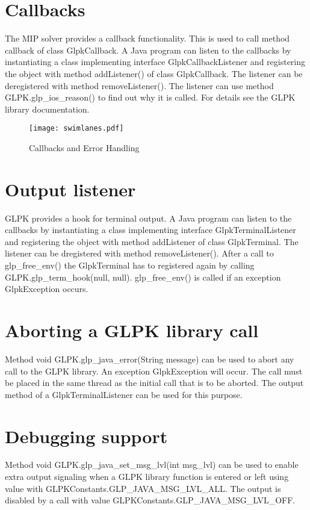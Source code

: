 \documentclass[a4paper,11pt]{report}
\begin{document}
\section{Callbacks}
The MIP solver provides a callback functionality. This is used to call
method callback of class GlpkCallback. A Java program can listen to the
callbacks by instantiating a class implementing interface
GlpkCallbackListener and registering the object with method addListener()
of class GlpkCallback. The listener can be deregistered with method
removeListener(). The listener can use method GLPK.glp\_ios\_reason() to find
out why it is called. For details see the GLPK library documentation.

\begin{landscape}
\begin{figure}
\caption{Callbacks and Error Handling}
\texttt{[image: swimlanes.pdf]}
\end{figure}
\end{landscape}

\section{Output listener}
GLPK provides a hook for terminal output. A Java program can listen to the
callbacks by instantiating a class implementing interface GlpkTerminalListener
and registering the object with method addListener of class GlpkTerminal.
The listener can be dregistered with method removeListener().
After a call to glp\_free\_env() the GlpkTerminal has to registered again
by calling GLPK.glp\_term\_hook(null, null). glp\_free\_env() is called if
an exception GlpkException occurs.

\section{Aborting a GLPK library call}
Method void GLPK.glp\_java\_error(String message) can be used to abort any call
to the GLPK library. An exception GlpkException will occur. The call must be
placed in the same thread as the initial call that is to be aborted.
The output method of a GlpkTerminalListener can be used for this purpose.

\section{Debugging support}
Method void GLPK.glp\_java\_set\_msg\_lvl(int msg\_lvl) can be used to enable
extra output signaling when a GLPK library function is entered or left using 
value with GLPKConstants.GLP\_JAVA\_MSG\_LVL\_ALL. The output is disabled by a
call with value GLPKConstants.GLP\_JAVA\_MSG\_LVL\_OFF.
\end{document}
